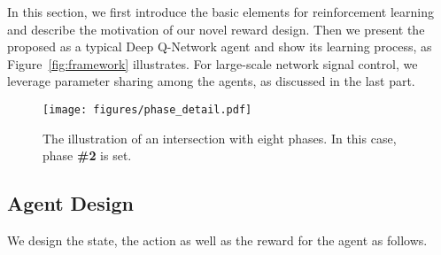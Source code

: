 In this section, we first introduce the basic elements for reinforcement learning and describe the motivation of our novel reward design. Then we present the proposed \PressLight as a typical Deep Q-Network agent and show its learning process, as Figure~\ref{fig:framework} illustrates. For large-scale network signal control, we leverage parameter sharing among the agents, as discussed in the last part.

\begin{figure}[t!]
\centering
\texttt{[image: figures/phase\_detail.pdf]} 
\caption{The illustration of an intersection with eight phases. In this case, phase \textbf{\#2} is set.}
\label{fig:phase}
\end{figure}


\subsection{Agent Design}
We design the state, the action as well as the reward for the \PressLight agent as follows.

